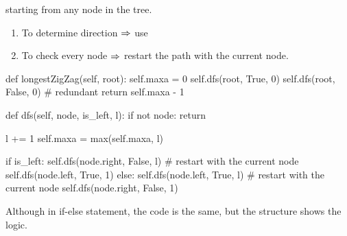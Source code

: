  starting from any node in the tree. 

\begin{enumerate}
\item To determine direction $\Rightarrow$ use 
\item To check every node $\Rightarrow$ restart the path with the current node. 
\end{enumerate}
\begin{python}
def longestZigZag(self, root):
    self.maxa = 0
    self.dfs(root, True, 0)
    self.dfs(root, False, 0)  # redundant
    return self.maxa - 1

def dfs(self, node, is_left, l):
    if not node:
        return

    l += 1
    self.maxa = max(self.maxa, l)
    
    if is_left:
        self.dfs(node.right, False, l)
        # restart with the current node
        self.dfs(node.left, True, 1)
    else:
        self.dfs(node.left, True, l)
        # restart with the current node
        self.dfs(node.right, False, 1)
\end{python}

Although in if-else statement, the code is the same, but the structure shows the logic.


